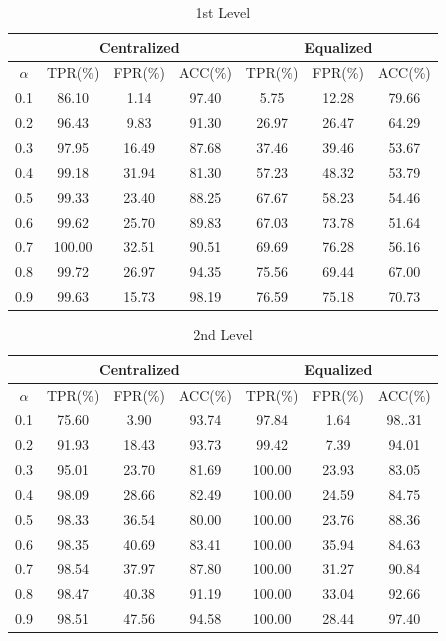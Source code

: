 \documentclass[a4paper]{IEEEtran}
\begin{document}
			\begin{table}[!ht]
				\centering
				\caption{1st Level}
				\label{tab:syn-result-1st}
				\begin{tabular}{|c|c|c|c|c|c|c|}
					\hline
					& \multicolumn{3}{c|}{Centralized} & \multicolumn{3}{c|}{Equalized}\\
					\hline
					$\alpha$ & TPR(\%) & FPR(\%) & ACC(\%) & TPR(\%) & FPR(\%) & ACC(\%) \\ 
					\hline
					0.1 & 86.10 & 1.14 & 97.40 & 5.75 & 12.28 & 79.66 \\ 
					\hline
					0.2 & 96.43 & 9.83 & 91.30 & 26.97 & 26.47 & 64.29 \\ 
					\hline
					0.3 & 97.95 & 16.49 & 87.68 & 37.46 & 39.46 & 53.67 \\ 
					\hline
					0.4 & 99.18 & 31.94 & 81.30 & 57.23 & 48.32 & 53.79 \\ 
					\hline
					0.5 & 99.33 & 23.40 & 88.25 & 67.67 & 58.23 & 54.46 \\ 
					\hline
					0.6 & 99.62 & 25.70 & 89.83 & 67.03 & 73.78 & 51.64 \\ 
					\hline
					0.7 & 100.00 & 32.51 & 90.51 & 69.69 & 76.28 & 56.16 \\ 
					\hline
					0.8 & 99.72 & 26.97 & 94.35 & 75.56 & 69.44 & 67.00 \\ 
					\hline
					0.9 & 99.63 & 15.73 & 98.19 & 76.59 & 75.18 & 70.73\\
					\hline
				\end{tabular} 
			\end{table}
			
			\begin{table}[!ht]
				\centering
				\caption{2nd Level}
				\label{tab:syn-result-2nd}
				\begin{tabular}{|c|c|c|c|c|c|c|}
					\hline
					& \multicolumn{3}{c|}{Centralized} & \multicolumn{3}{c|}{Equalized}\\
					\hline
					$\alpha$ & TPR(\%) & FPR(\%) & ACC(\%) & TPR(\%) & FPR(\%) & ACC(\%) \\ 
					\hline
					0.1 & 75.60 & 3.90 & 93.74 & 97.84 & 1.64 & 98..31 \\ 
					\hline
					0.2 & 91.93 & 18.43 & 93.73 & 99.42 & 7.39 & 94.01 \\ 
					\hline
					0.3 & 95.01 & 23.70 & 81.69 & 100.00 & 23.93 & 83.05 \\ 
					\hline
					0.4 & 98.09 & 28.66 & 82.49 & 100.00 & 24.59 & 84.75 \\ 
					\hline
					0.5 & 98.33 & 36.54 & 80.00 & 100.00 & 23.76 & 88.36 \\ 
					\hline
					0.6 & 98.35 & 40.69 & 83.41 & 100.00 & 35.94 & 84.63 \\ 
					\hline
					0.7 & 98.54 & 37.97 & 87.80 & 100.00 & 31.27 & 90.84 \\ 
					\hline
					0.8 & 98.47 & 40.38 & 91.19 & 100.00 & 33.04 & 92.66 \\ 
					\hline
					0.9 & 98.51 & 47.56 & 94.58 & 100.00 & 28.44 & 97.40\\
					\hline
				\end{tabular} 
			\end{table}
			
\end{document}
